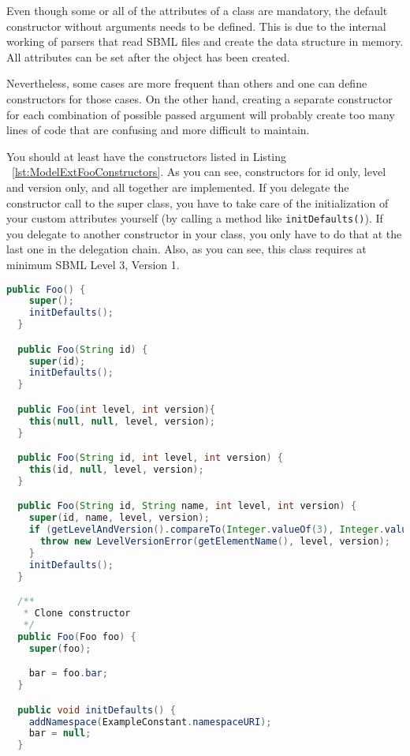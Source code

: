 Even though some or all of the attributes of a class are mandatory, the default constructor without arguments needs to be defined.
This is due to the internal working of parsers that read SBML files and create the data structure in memory.
All attributes can be set after the object has been created.

Nevertheless, some cases are more frequent than others and one can define constructors for those cases.
On the other hand, creating a separate constructor for each combination of possible passed argument will probably create too many lines of code
that are confusing and more difficult to maintain.

You should at least have the constructors listed in Listing ~\vref{lst:ModelExtFooConstructors}.
As you can see, constructors for id only, level and version only, and all together are implemented.
If you delegate the constructor call to the super class, you have to take care of the initialization of your custom attributes yourself (by calling a method like \texttt{initDefaults()}).
If you delegate to another constructor in your class, you only have to do that at the last one in the delegation chain.
Also, as you can see, this class requires at minimum SBML Level 3, Version 1.

\begin{lstlisting}[language=Java,caption={Constructors for \texttt{Foo}},label={lst:ModelExtFooConstructors}]
  public Foo() {
    super();
    initDefaults();
  }

  public Foo(String id) {
    super(id);
    initDefaults();
  }

  public Foo(int level, int version){
    this(null, null, level, version);
  }

  public Foo(String id, int level, int version) {
    this(id, null, level, version);
  }

  public Foo(String id, String name, int level, int version) {
    super(id, name, level, version);
    if (getLevelAndVersion().compareTo(Integer.valueOf(3), Integer.valueOf(1)) < 0) {
      throw new LevelVersionError(getElementName(), level, version);
    }
    initDefaults();
  }

  /**
   * Clone constructor
   */
  public Foo(Foo foo) {
    super(foo);

    bar = foo.bar;
  }

  public void initDefaults() {
    addNamespace(ExampleConstant.namespaceURI);
    bar = null;
  }
\end{lstlisting}

